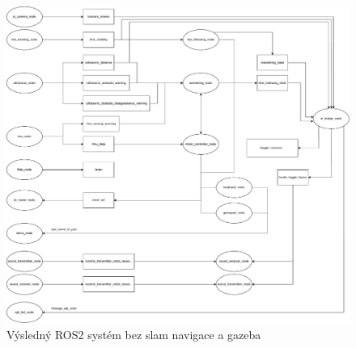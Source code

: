 
%






\begin{figure}[h!]
	\centering
	\includegraphics[scale=0.3]{obrazky-figures/ros2_system.pdf}
	\caption{Výsledný ROS2 systém bez slam navigace a gazeba}
	\label{}
\end{figure}

%

